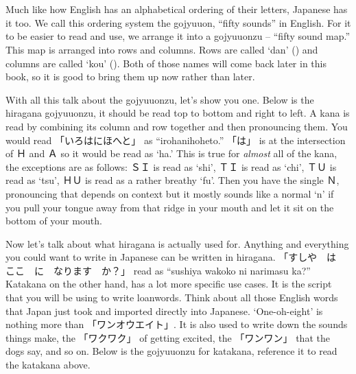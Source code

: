 \section[五十音図]{}\label{sec:PR;仮名;五十音図}

Much like how English has an alphabetical ordering of their letters, Japanese has it too. We call this ordering system the gojyuuon, ``fifty sounds'' in English. For it to be easier to read and use, we arrange it into a gojyuuonzu -- ``fifty sound map.'' This map is arranged into rows and columns. Rows are called `dan' () and columns are called `kou' (). Both of those names will come back later in this book, so it is good to bring them up now rather than later.

With all this talk about the gojyuuonzu, let's show you one. Below is the hiragana gojyuuonzu, it should be read top to bottom and right to left. A kana is read by combining its column and row together and then pronouncing them. You would read 「いろはにほへと」 as ``irohanihoheto.'' 「は」 is at the intersection of Ｈ and Ａ so it would be read as `ha.' This is true for \textit{almost} all of the kana, the exceptions are as follows: ＳＩ is read as `shi', ＴＩ is read as `chi', ＴＵ is read as `tsu', ＨＵ is read as a rather breathy `fu'. Then you have the single Ｎ, pronouncing that depends on context but it mostly sounds like a normal `n' if you pull your tongue away from that ridge in your mouth and let it sit on the bottom of your mouth. 



Now let's talk about what hiragana is actually used for. Anything and everything you could want to write in Japanese can be written in hiragana. 「すしや　は　ここ　に　なります　か？」 read as ``sushiya wa\footnotemark koko ni narimasu ka?'' Katakana on the other hand, has a lot more specific use cases. It is the script that you will be using to write loanwords. Think about all those English words that Japan just took and imported directly into Japanese. `One-oh-eight' is nothing more than 「ワンオウエイト」. It is also used to write down the sounds things make, the 「ワクワク」 of getting excited, the 「ワンワン」 that the dogs say, and so on. Below is the gojyuuonzu for katakana, reference it to read the katakana above.


